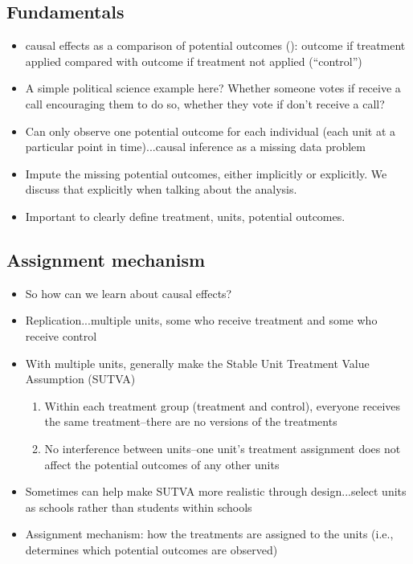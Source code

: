 \documentclass[11pt,titlepage]{article}
\begin{document}
\subsection{Fundamentals}
\begin{itemize}
\item causal effects as a comparison of potential outcomes (\cite{Rubin74}): outcome if treatment applied compared with outcome if
treatment not applied (``control'')
\item A simple political science example here?  Whether someone votes if receive a call encouraging them to do so, whether they vote if don't receive a call?
\item Can only observe one potential outcome for each individual (each unit at a particular point in time)...causal inference as a missing data problem
\item Impute the missing potential outcomes, either implicitly or explicitly.  We discuss that explicitly when talking about the analysis.
\item Important to clearly define treatment, units, potential outcomes.  
\end{itemize}


\subsection{Assignment mechanism}
\begin{itemize}
\item So how can we learn about causal effects?
\item Replication...multiple units, some who receive treatment and some who receive control
\item With multiple units, generally make the Stable Unit Treatment Value Assumption (SUTVA) 
\begin{enumerate}
\item Within each treatment group (treatment and control), everyone receives the same treatment--there are no versions of the treatments
\item No interference between units--one unit's treatment assignment does not affect the potential outcomes of any other units
\end{enumerate}
\item Sometimes can help make SUTVA more realistic through design...select units as schools rather than students within schools
\item Assignment mechanism: how the treatments are assigned to the units (i.e., determines which potential outcomes are observed)
\end{itemize}
\end{document}
